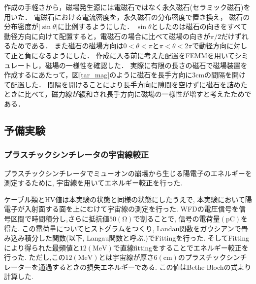 作成の手軽さから，磁場発生源には電磁石ではなく永久磁石(セラミック磁石)を用いた．
電磁石における電流密度を，永久磁石の分布密度で置き換え，
磁石の分布密度が$|\sin\theta|$に比例するようにした．
$\sin\theta$としたのは磁石の向きをすべて動径方向に向けて配置すると，電磁石の場合に比べて磁場の向きが$\pi/2$だけずれるためである．
また磁石の磁場方向は$0<\theta<\pi$と$\pi<\theta<2\pi$で動径方向に対して正と負になるようにした．
作成に入る前に考えた配置をFEMMを用いてシミュレートし，磁場の一様性を確認した．
実際に有限の長さの磁石で磁場装置を作成するにあたって，図\ref{tar_mag}のように磁石を長手方向に$3\mathrm{cm}$の間隔を開けて配置した．
間隔を開けることにより長手方向に隙間を空けずに磁石を詰めたときに比べて，磁力線が緩和され長手方向に磁場の一様性が増すと考えたためである．

\newpage
\subsection{予備実験}
\subsubsection{プラスチックシンチレータの宇宙線較正}
プラスチックシンチレータでミューオンの崩壊から生じる陽電子のエネルギーを測定するために, 宇宙線を用いてエネルギー較正を行った.

ケーブル類とHV値は本実験の状態と同様の状態にしたうえで,
本実験において陽電子が入射面する面を上にむけて宇宙線の測定を行った.
WFDの電圧信号を信号区間で時間積分し,さらに抵抗値$50(\mathrm{\Omega})$で割ることで,
信号の電荷量$(\mathrm{pC})$を得た.
この電荷量についてヒストグラムをつくり, Landau関数をガウシアンで畳み込み積分した関数(以下, Langau関数と呼ぶ.)でFittingを行った.
そしてFittingにより得られた最頻値と$12(\mathrm{MeV})$で直線fittingをすることでエネルギー較正を行った.
ただし,この$12(\mathrm{MeV})$とは宇宙線が厚さ$6(\mathrm{cm})$のプラスチックシンチレーターを通過するときの損失エネルギーである.
この値はBethe-Blochの式より計算した.\cite{leo}

